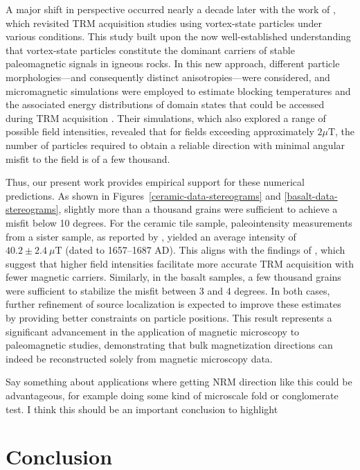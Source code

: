 A major shift in perspective occurred nearly a decade later with the work of \citet{Bellon2025}, which revisited TRM acquisition studies using vortex-state particles under various conditions. This study built upon the now well-established understanding that vortex-state particles constitute the dominant carriers of stable paleomagnetic signals in igneous rocks. In this new approach, different particle morphologies—and consequently distinct anisotropies—were considered, and micromagnetic simulations were employed to estimate blocking temperatures and the associated energy distributions of domain states that could be accessed during TRM acquisition \citep{Bellon2025}. Their simulations, which also explored a range of possible field intensities, revealed that for fields exceeding approximately $2 \mu \text{T}$, the number of particles required to obtain a reliable direction with minimal angular misfit to the field is of a few thousand.
 
Thus, our present work provides empirical support for these numerical predictions. As shown in Figures~\ref{ceramic-data-stereograms} and \ref{basalt-data-stereograms}, slightly more than a thousand grains were sufficient to achieve a misfit below 10 degrees. For the ceramic tile sample, paleointensity measurements from a sister sample, as reported by \citet{Poletti2016}, yielded an average intensity of $40.2 \pm 2.4\ \mu\text{T}$ (dated to 1657–1687 AD). This aligns with the findings of \citet{Bellon2025}, which suggest that higher field intensities facilitate more accurate TRM acquisition with fewer magnetic carriers. Similarly, in the basalt samples, a few thousand grains were sufficient to stabilize the misfit between 3 and 4 degrees.  
In both cases, further refinement of source localization is expected to improve these estimates by providing better constraints on particle positions. This result represents a significant advancement in the application of magnetic microscopy to paleomagnetic studies, demonstrating that bulk magnetization directions can indeed be reconstructed solely from magnetic microscopy data.

Say something about applications where getting NRM direction like this could be advantageous, for example doing some kind of microscale fold or conglomerate test. I think this should be an important conclusion to highlight


\section{Conclusion}

